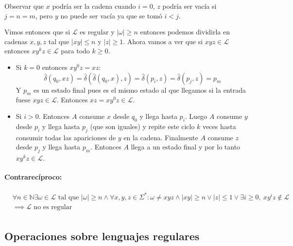 \begin{demoPart}[0.8\textwidth]

  Observar que \(x\) podría ser la cadena cuando \(i = 0\), \(z\) podría ser vacía si \(j = n = m\), pero \(y\) no puede ser vacía ya que se tomó \(i < j\).

  Vimos entonces que si \(\mathcal{L}\) es regular y \(|\omega| \geq n\) entonces podemos dividirla en cadenas \(x,y,z\) tal que \(|xy|\leq n\) y \(|z|\geq 1\). Ahora vamos a ver que si \(xyz \in \mathcal{L}\) entonces \(xy^kz \in \mathcal{L}\) para todo \(k\geq 0\).

  \begin{itemize}
    \item Si \(k = 0\) entonces \(xy^0z = xz\):
          \[\hat\delta(q_0, xz) = \hat\delta(\hat\delta(q_0, x), z) = \hat\delta(p_i, z) = \hat\delta(p_j, z) = p_m\]
          Y \(p_m\) es un estado final pues es el mismo estado al que llegamos si la entrada fuese \(xyz\in\mathcal{L}\). Entonces \(xz = xy^0z \in \mathcal{L}\).
    \item Si \(i > 0\). Entonces \(A\) consume \(x\) desde \(q_0\) y llega hasta \(p_i\). Luego \(A\) consume \(y\) desde \(p_i\) y llega hasta \(p_j\) (que son iguales) y repite este ciclo \(k\) veces hasta consumir todas las apariciones de \(y\) en la cadena. Finalmente \(A\) consume \(z\) desde \(p_j\) y llega hasta \(p_m\). Entonces \(A\) llega a un estado final y por lo tanto \(xy^kz \in \mathcal{L}\).
  \end{itemize}
\end{demoPart}
\paragraph{Contrarecíproco:}
\begin{align*}
   & \forall   n\in\mathbb{N}  \exists\omega\in\mathcal{L}\text{ tal que } |\omega|\geq n \land  \forall x,y,z\in\Sigma^*: \omega\neq xyz \land|xy|\geq n\lor|z|\leq 1 \lor \exists i\geq 0,~ xy^iz\notin\mathcal{L} \\ &
  \implies \mathcal{L}\text{  no es regular}                                                                                                                                                                         \\
\end{align*}

\subsection{Operaciones sobre lenguajes regulares}

